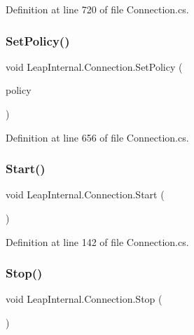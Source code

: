 Definition at line 720 of file Connection.\+cs.

\mbox{\label{class_leap_internal_1_1_connection_a973bcc5a80165662305ca53cc153ffaf}} 
\subsubsection{\texorpdfstring{SetPolicy()}{SetPolicy()}}
{\footnotesize\ttfamily void Leap\+Internal.\+Connection.\+Set\+Policy (\begin{DoxyParamCaption}\item[{\mbox{\hyperlink{class_leap_1_1_controller_a0bdb49fa94aa2da8b098c1ac296528d6}{Controller.\+Policy\+Flag}}}]{policy }\end{DoxyParamCaption})}



Definition at line 656 of file Connection.\+cs.

\mbox{\label{class_leap_internal_1_1_connection_a33962c567068d008ec6779c2641584b0}} 
\subsubsection{\texorpdfstring{Start()}{Start()}}
{\footnotesize\ttfamily void Leap\+Internal.\+Connection.\+Start (\begin{DoxyParamCaption}{ }\end{DoxyParamCaption})}



Definition at line 142 of file Connection.\+cs.

\mbox{\label{class_leap_internal_1_1_connection_aea1fa03cd6daf0b54561ff2221a8f3be}} 
\subsubsection{\texorpdfstring{Stop()}{Stop()}}
{\footnotesize\ttfamily void Leap\+Internal.\+Connection.\+Stop (\begin{DoxyParamCaption}{ }\end{DoxyParamCaption})}



